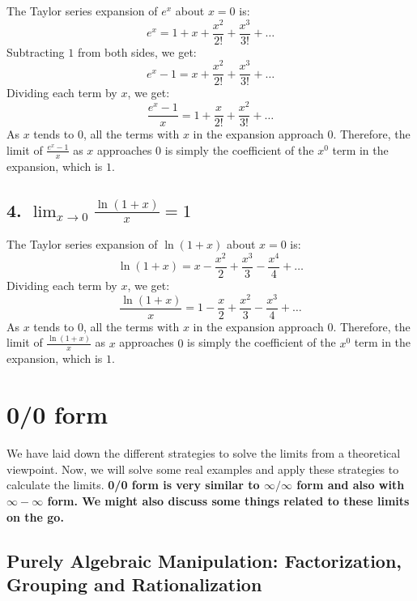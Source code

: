 The Taylor series expansion of $e^x$ about $x = 0$ is:
\[
e^x = 1 + x + \frac{x^2}{2!} + \frac{x^3}{3!} + \ldots
\]
Subtracting $1$ from both sides, we get:
\[
e^x - 1 = x + \frac{x^2}{2!} + \frac{x^3}{3!} + \ldots
\]
Dividing each term by $x$, we get:
\[
\frac{e^x - 1}{x} = 1 + \frac{x}{2!} + \frac{x^2}{3!} + \ldots
\]
As $x$ tends to $0$, all the terms with $x$ in the expansion approach $0$. Therefore, the limit of $\frac{e^x - 1}{x}$ as $x$ approaches $0$ is simply the coefficient of the $x^0$ term in the expansion, which is $1$.

\subsection*{4. $\lim_{x \to 0} \frac{\ln(1 + x)}{x} = 1$}

The Taylor series expansion of $\ln(1 + x)$ about $x = 0$ is:
\[
\ln(1 + x) = x - \frac{x^2}{2} + \frac{x^3}{3} - \frac{x^4}{4} + \ldots
\]
Dividing each term by $x$, we get:
\[
\frac{\ln(1 + x)}{x} = 1 - \frac{x}{2} + \frac{x^2}{3} - \frac{x^3}{4} + \ldots
\]
As $x$ tends to $0$, all the terms with $x$ in the expansion approach $0$. Therefore, the limit of $\frac{\ln(1 + x)}{x}$ as $x$ approaches $0$ is simply the coefficient of the $x^0$ term in the expansion, which is $1$.


\section{0/0 form}

We have laid down the different strategies to solve the limits from a theoretical viewpoint. Now, we will solve some real examples and apply these strategies to calculate the limits. \textbf{0/0 form is very similar to $\infty/\infty$ form and also with $\infty-\infty$ form. We might also discuss some things related to these limits on the go.}

\subsection{Purely Algebraic Manipulation: Factorization, Grouping and Rationalization}

